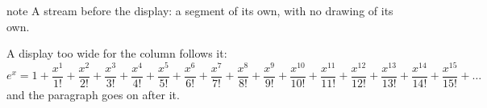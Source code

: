 \begin{webstream}{note}
A stream before the display: a segment of its own, with no drawing of its own.
\end{webstream}
A display too wide for the column follows it:
\[
  e^{x} = 1 + \frac{x^{1}}{1!} + \frac{x^{2}}{2!} + \frac{x^{3}}{3!} + \frac{x^{4}}{4!} + \frac{x^{5}}{5!} + \frac{x^{6}}{6!} + \frac{x^{7}}{7!} + \frac{x^{8}}{8!} + \frac{x^{9}}{9!} + \frac{x^{10}}{10!} + \frac{x^{11}}{11!} + \frac{x^{12}}{12!} + \frac{x^{13}}{13!} + \frac{x^{14}}{14!} + \frac{x^{15}}{15!} + \dots
\]
and the paragraph goes on after it.
